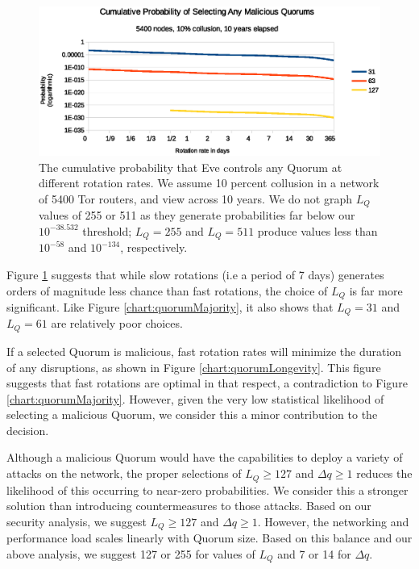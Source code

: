 \documentclass{sig-alternate}
\begin{document}
\begin{figure}[h]
	\centering
	\includegraphics[width=\linewidth]{../analysis/CumulativeMaliciousQuorum.eps}
	\caption{The cumulative probability that Eve controls any Quorum at different rotation rates. We assume 10 percent collusion in a network of 5400 Tor routers, and view across 10 years. We do not graph $ L_{Q} $ values of 255 or 511 as they generate probabilities far below our $ 10^{-38.532} $ threshold; $ L_{Q} = 255 $ and $ L_{Q} = 511 $ produce values less than $ 10^{-58} $ and $ 10^{-134} $, respectively.}
	\label{chart:cumulativeProbability}
\end{figure}

Figure \ref{chart:cumulativeProbability} suggests that while slow rotations (i.e a period of 7 days) generates orders of magnitude less chance than fast rotations, the choice of $ L_{Q} $ is far more significant. Like Figure \ref{chart:quorumMajority}, it also shows that $ L_{Q} = 31 $ and $ L_{Q} = 61 $ are relatively poor choices.

If a selected Quorum is malicious, fast rotation rates will minimize the duration of any disruptions, as shown in Figure \ref{chart:quorumLongevity}. This figure suggests that fast rotations are optimal in that respect, a contradiction to Figure \ref{chart:quorumMajority}. However, given the very low statistical likelihood of selecting a malicious Quorum, we consider this a minor contribution to the decision.

Although a malicious Quorum would have the capabilities to deploy a variety of attacks on the network, the proper selections of $ L_{Q} \geq 127 $ and $ \Delta q \geq 1 $ reduces the likelihood of this occurring to near-zero probabilities. We consider this a stronger solution than introducing countermeasures to those attacks. Based on our security analysis, we suggest $ L_{Q} \geq 127 $ and $ \Delta q \geq 1 $. However, the networking and performance load scales linearly with Quorum size. Based on this balance and our above analysis, we suggest 127 or 255 for values of $ L_{Q} $ and 7 or 14 for $ \Delta q $.
\end{document}
